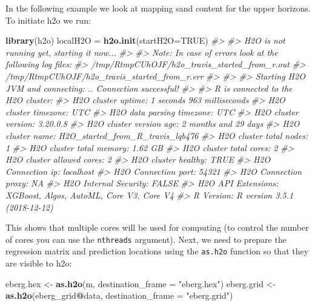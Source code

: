 \documentclass[graybox,natbib,nospthms,UStrade]{svmono}
\newenvironment{Shaded}{\begin{snugshade}}{\end{snugshade}}
\newcommand{\CommentTok}[1]{\textcolor[rgb]{0.37,0.37,0.37}{\textit{#1}}}
\newcommand{\DataTypeTok}[1]{\textcolor[rgb]{0.27,0.27,0.27}{#1}}
\newcommand{\KeywordTok}[1]{\textcolor[rgb]{0.27,0.27,0.27}{\textbf{#1}}}
\newcommand{\NormalTok}[1]{#1}
\newcommand{\OperatorTok}[1]{\textcolor[rgb]{0.43,0.43,0.43}{\textbf{#1}}}
\newcommand{\OtherTok}[1]{\textcolor[rgb]{0.37,0.37,0.37}{#1}}
\newcommand{\StringTok}[1]{\textcolor[rgb]{0.5,0.5,0.5}{#1}}
\begin{document}
In the following example we look at mapping sand content for the upper horizons. To initiate h2o we run:

\begin{Shaded}
\begin{Highlighting}[]
\KeywordTok{library}\NormalTok{(h2o)}
\NormalTok{localH2O =}\StringTok{ }\KeywordTok{h2o.init}\NormalTok{(}\DataTypeTok{startH2O=}\OtherTok{TRUE}\NormalTok{)}
\CommentTok{#> }
\CommentTok{#> H2O is not running yet, starting it now...}
\CommentTok{#> }
\CommentTok{#> Note:  In case of errors look at the following log files:}
\CommentTok{#>     /tmp/RtmpCUhOJF/h2o_travis_started_from_r.out}
\CommentTok{#>     /tmp/RtmpCUhOJF/h2o_travis_started_from_r.err}
\CommentTok{#> }
\CommentTok{#> }
\CommentTok{#> Starting H2O JVM and connecting: .. Connection successful!}
\CommentTok{#> }
\CommentTok{#> R is connected to the H2O cluster: }
\CommentTok{#>     H2O cluster uptime:         1 seconds 963 milliseconds }
\CommentTok{#>     H2O cluster timezone:       UTC }
\CommentTok{#>     H2O data parsing timezone:  UTC }
\CommentTok{#>     H2O cluster version:        3.20.0.8 }
\CommentTok{#>     H2O cluster version age:    2 months and 29 days  }
\CommentTok{#>     H2O cluster name:           H2O_started_from_R_travis_lqb476 }
\CommentTok{#>     H2O cluster total nodes:    1 }
\CommentTok{#>     H2O cluster total memory:   1.62 GB }
\CommentTok{#>     H2O cluster total cores:    2 }
\CommentTok{#>     H2O cluster allowed cores:  2 }
\CommentTok{#>     H2O cluster healthy:        TRUE }
\CommentTok{#>     H2O Connection ip:          localhost }
\CommentTok{#>     H2O Connection port:        54321 }
\CommentTok{#>     H2O Connection proxy:       NA }
\CommentTok{#>     H2O Internal Security:      FALSE }
\CommentTok{#>     H2O API Extensions:         XGBoost, Algos, AutoML, Core V3, Core V4 }
\CommentTok{#>     R Version:                  R version 3.5.1 (2018-12-12)}
\end{Highlighting}
\end{Shaded}

This shows that multiple cores will be used for computing (to control the number of cores you can use the \texttt{nthreads} argument). Next, we need to prepare the regression matrix and prediction locations using the \texttt{as.h2o} function so that they are visible to h2o:

\begin{Shaded}
\begin{Highlighting}[]
\NormalTok{eberg.hex <-}\StringTok{ }\KeywordTok{as.h2o}\NormalTok{(m, }\DataTypeTok{destination_frame =} \StringTok{"eberg.hex"}\NormalTok{)}
\NormalTok{eberg.grid <-}\StringTok{ }\KeywordTok{as.h2o}\NormalTok{(eberg_grid}\OperatorTok{@}\NormalTok{data, }\DataTypeTok{destination_frame =} \StringTok{"eberg.grid"}\NormalTok{)}
\end{Highlighting}
\end{Shaded}
\end{document}
